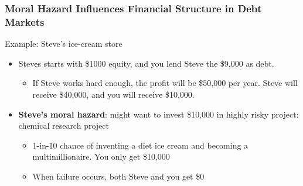 \documentclass[aspectratio=169]{beamer}
\begin{document}
\begin{frame}
\frametitle{Moral Hazard Influences Financial Structure in Debt Markets}


Example: Steve’s ice-cream store
\begin{itemize} 
    \medskip 
    \item Steves starts with \$1000 equity, and you lend Steve the \$9,000 as debt. 
    \begin{itemize}
        \item If Steve works hard enough, the profit will be \$50,000   per year. Steve will receive \$40,000, and you will receive \$10,000.
    \end{itemize}
    \medskip 
    \item \textbf{Steve's moral hazard}: might want to invest \$10,000 in highly risky project: chemical research project
    \begin{itemize}
        \item 1-in-10 chance of inventing a diet ice cream and becoming a multimillionaire. You only get \$10,000 %
        \item When failure occurs, both Steve and you get \$0 %
    \end{itemize}
\end{itemize}


\end{frame}
\end{document}
